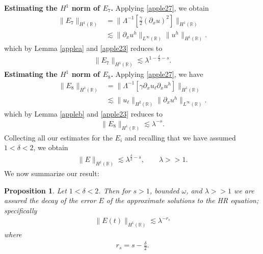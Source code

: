 \documentclass[12pt,reqno]{amsart}
\newcommand{\rr}{\mathbb{R}}
\newcommand{\p}{\partial}
\theoremstyle{plain}  %
\newtheorem{proposition}{Proposition}
\theoremstyle{definition}
\begin{document}
%
%
\vskip0.1in
%
%
{\bf Estimating the $H^1$ norm of $\hyperref[all_errors_together]{E_7}$.} Applying \eqref{apple27}, we obtain
\begin{equation}
	\begin{split}
		\|E_7\|_{H^1(\rr)} 
		& = \|\Lambda^{-1} \left[ \frac{\gamma}{2}\left( \p_x u \right)^2
		\right]\|_{H^1(\rr)}
		\\
		& \lesssim  \|\p_x u^h\|_{L^\infty(\rr)} \|u^h\|_{H^1(\rr)}.
		\label{apple32}
	\end{split}
\end{equation}
which by Lemma \ref{applea} and \eqref{apple23} reduces to
\begin{equation}
	\begin{split}
		\|E_7\|_{H^1(\rr)} \lesssim \lambda^{1-\frac{\delta}{2}-s}.
		\label{apple33'}
	\end{split}
\end{equation}
%
%
\vskip0.1in
%
%
{\bf Estimating the $H^1$ norm of $\hyperref[all_errors_together]{E_8}$.} Applying \eqref{apple27}, we have
\begin{equation}
	\begin{split}
		\|E_8\|_{H^1(\rr)}
		& = \|\Lambda^{-1}\left[ \gamma \p_x u_\ell \p_x u^h \right]\|_{H^1(\rr)}
		\\
		& \lesssim \|u_\ell\|_{H^2(\rr)} \|\p_x u^h\|_{L^\infty(\rr)}.
		\label{apple33}
	\end{split}
\end{equation}
which by Lemma \ref{appleb} and \eqref{apple23} reduces to
\begin{equation}
	\begin{split}
		\|E_8\|_{H^1(\rr)} \lesssim \lambda^{-s}.
		\label{apple34}
	\end{split}
\end{equation}
Collecting all our estimates for the $E_i$ and recalling that we have assumed
$1<\delta<2$, we obtain
\begin{equation*}
	\begin{split}
		\|E\|_{H^1(\rr)}
		 \lesssim \lambda^{\frac{\delta}{2} -s }, \qquad \lambda >>1.
	\end{split}
\end{equation*}
We now summarize our result:
%
%
\begin{proposition}
	Let $1<\delta<2$. Then for $s > 1$, bounded $\omega$, and
	$\lambda >>1$ we are assured the decay of the error $E$ of the
	approximate solutions to the HR equation; specifically
	\begin{equation}
		\begin{split}
			\|E(t)\|_{H^1(\rr)} \lesssim \lambda^{-r_s}
			\label{apple35}
		\end{split}
	\end{equation}
	where
	\begin{equation}
		\begin{split}
			r_s = s - \frac{\delta}{2}.   
			\label{appler_s}
		\end{split}
	\end{equation}
\end{proposition}
\end{document}
